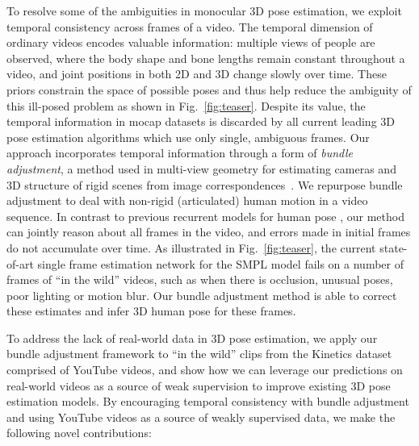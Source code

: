 \documentclass[10pt,twocolumn,letterpaper]{article}
\begin{document}
To resolve some of the ambiguities in monocular 3D pose estimation, we exploit temporal consistency across frames of a video.
The temporal dimension of ordinary videos encodes valuable information:
multiple views of people are observed, where the body shape and bone lengths remain constant throughout a video, and joint positions in both 2D and 3D change slowly over time.
These priors constrain the space of possible poses and thus help reduce the ambiguity of this ill-posed problem as shown in Fig.~\ref{fig:teaser}.
Despite its value, the temporal information in mocap datasets is discarded by all current leading 3D pose estimation algorithms \cite{kanazawa_cvpr_2018, pavlakos_cvpr_2018, sun_eccv_2018, martinez_iccv_2017} which use only single, ambiguous frames.
Our approach incorporates temporal information through a form of {\em bundle adjustment}, a method used in multi-view geometry for estimating cameras and 3D structure of rigid 
scenes from image correspondences~\cite{Hartley04a,Triggs00b}.
We repurpose bundle adjustment to deal with non-rigid (articulated) human motion in a video sequence.
In contrast to previous recurrent models for human pose \cite{hossain_eccv_2018}, our method can jointly reason about all frames in the video, and errors made in initial frames do not accumulate over time.
As illustrated in Fig.~\ref{fig:teaser}, the current state-of-art single frame estimation network for the SMPL model \cite{kanazawa_cvpr_2018} fails on a number of frames of  ``in the wild'' videos, such as when there is occlusion, unusual poses, poor lighting or motion blur.
Our bundle adjustment method is able to correct these estimates and infer 3D human pose for these frames.

To address the lack of real-world data in 3D pose estimation, we apply our bundle adjustment framework to ``in the wild'' clips from the Kinetics dataset~\cite{kay_arxiv_2017} comprised of YouTube videos, and show how we can leverage our predictions on real-world videos as a source of weak supervision to improve existing 3D pose estimation models.
By encouraging temporal consistency with bundle adjustment and using YouTube videos as a source of weakly supervised data, we make the following novel contributions:
\end{document}
